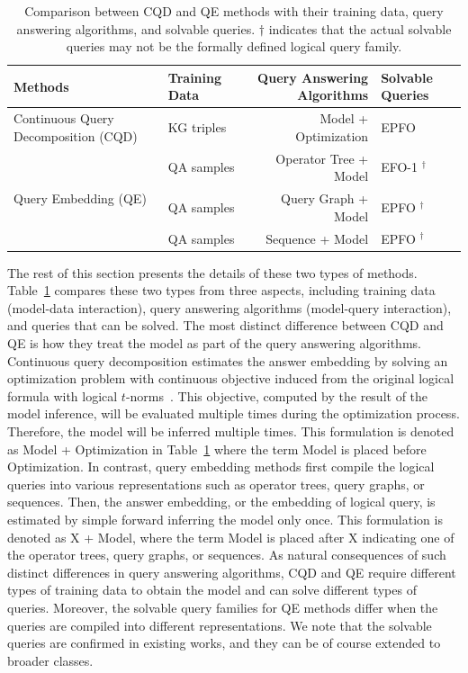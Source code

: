 \documentclass[11pt]{article}
\begin{document}
\begin{table}[t]
\small\centering
\caption{Comparison between CQD and QE methods with their training data, query answering algorithms, and solvable queries. $\dag$ indicates that the actual solvable queries may not be the formally defined logical query family.}\label{tab:compare-method}
\begin{tabular}{llrl}
\toprule
Methods                        & Training Data & Query Answering Algorithms & Solvable Queries \\ \midrule
Continuous Query Decomposition (CQD)
  & KG triples                     & Model + Optimization          & EPFO             \\\midrule
\multirow{3}{*}{Query Embedding (QE)} & QA samples & Operator Tree + Model & EFO-1 $^\dag$ \\
                                 & QA samples & Query Graph + Model & EPFO $^\dag$ \\
                                 & QA samples & Sequence + Model & EPFO $^\dag$  \\ \bottomrule
\end{tabular}
\end{table}

The rest of this section presents the details of these two types of methods. Table~\ref{tab:compare-method} compares these two types from three aspects, including training data (model-data interaction), query answering algorithms (model-query interaction), and queries that can be solved.
The most distinct difference between CQD and QE is how they treat the model as part of the query answering algorithms.
Continuous query decomposition estimates the answer embedding by solving an optimization problem with continuous objective induced from the original logical formula with logical $t$-norms~\cite{Hajek1998MetamathematicsFuzzy}. This objective, computed by the result of the model inference, will be evaluated multiple times during the optimization process. Therefore, the model will be inferred multiple times. This formulation is denoted as Model + Optimization in Table~\ref{tab:compare-method} where the term Model is placed before Optimization.
In contrast, query embedding methods first compile the logical queries into various representations such as operator trees, query graphs, or sequences. Then, the answer embedding, or the embedding of logical query, is estimated by simple forward inferring the model only once. This formulation is denoted as X + Model, where the term Model is placed after X indicating one of the operator trees, query graphs, or sequences.
As natural consequences of such distinct differences in query answering algorithms, CQD and QE require different types of training data to obtain the model and can solve different types of queries. Moreover, the solvable query families for QE methods differ when the queries are compiled into different representations. We note that the solvable queries are confirmed in existing works, and they can be of course extended to broader classes.
\end{document}
